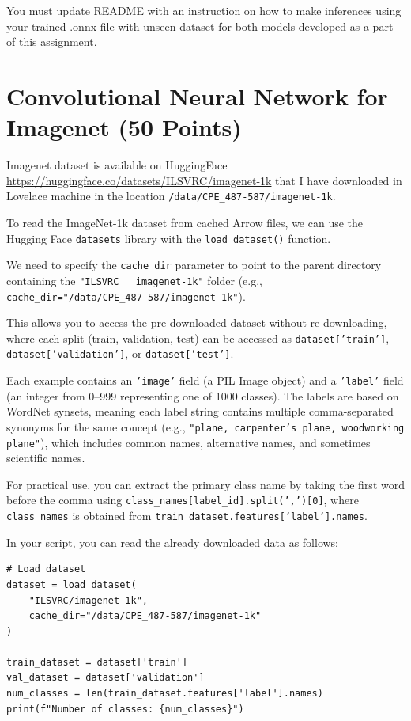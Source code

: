 \documentclass[12pt, xcolor=dvipsnames,svgnames,x11names]{article}
\begin{document}
You must update README with an instruction on how to make inferences using your trained .onnx file with unseen dataset for both models developed as a part of this assignment.


\section{Convolutional Neural Network for Imagenet \hfill \textbf{(50 Points)}}

Imagenet dataset is available on HuggingFace \url{https://huggingface.co/datasets/ILSVRC/imagenet-1k} that I have downloaded in Lovelace machine in the location \texttt{/data/CPE_487-587/imagenet-1k}.

To read the ImageNet-1k dataset from cached Arrow files, we can use the Hugging Face \texttt{datasets} library with the \texttt{load_dataset()} function.


We need to specify the \texttt{cache_dir} parameter to point to the parent directory containing the \texttt{"ILSVRC___imagenet-1k"} folder (e.g., \texttt{cache_dir="/data/CPE_487-587/imagenet-1k"}). 

This allows you to access the pre-downloaded dataset without re-downloading, where each split (train, validation, test) can be accessed as \texttt{dataset['train']}, \texttt{dataset['validation']}, or \texttt{dataset['test']}. 

Each example contains an \texttt{'image'} field (a PIL Image object) and a \texttt{'label'} field (an integer from 0--999 representing one of 1000 classes). The labels are based on WordNet synsets, meaning each label string contains multiple comma-separated synonyms for the same concept (e.g., \texttt{"plane, carpenter's plane, woodworking plane"}), which includes common names, alternative names, and sometimes scientific names. 

For practical use, you can extract the primary class name by taking the first word before the comma using \texttt{class_names[label_id].split(',')[0]}, where \texttt{class_names} is obtained from \texttt{train_dataset.features['label'].names}.



In your script, you can read the already downloaded data as follows:

\begin{verbatim}
# Load dataset
dataset = load_dataset(
    "ILSVRC/imagenet-1k",
    cache_dir="/data/CPE_487-587/imagenet-1k"
)

train_dataset = dataset['train']
val_dataset = dataset['validation']
num_classes = len(train_dataset.features['label'].names)
print(f"Number of classes: {num_classes}")

\end{verbatim}
\end{document}

